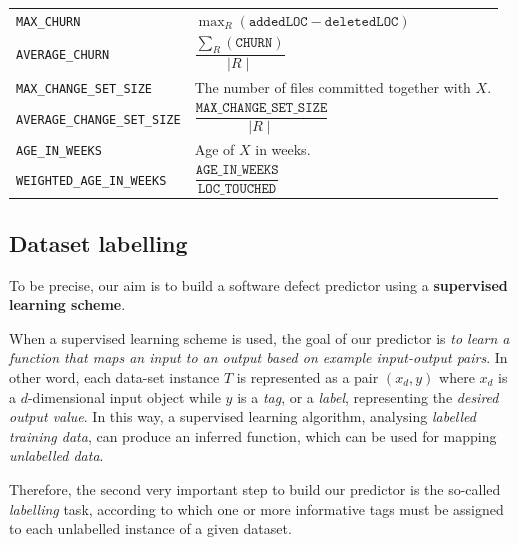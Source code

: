 \documentclass[sigconf]{acmart}
\begin{document}
\begin{table}
\begin{tabular}{l|p{4.3cm}}
\\

\texttt{MAX\_CHURN} & $\max_R (\texttt{addedLOC} - \texttt{deletedLOC})$

\\

\texttt{AVERAGE\_CHURN} & $\dfrac{\sum_R (\texttt{CHURN})}{\mid R \mid}$

\\

\texttt{MAX\_CHANGE\_SET\_SIZE} & The number of files committed together with $X$.

\\

\texttt{AVERAGE\_CHANGE\_SET\_SIZE} & $\dfrac{\texttt{MAX\_CHANGE\_SET\_SIZE}}{\mid R \mid}$

\\

\texttt{AGE\_IN\_WEEKS} & Age of $X$ in weeks.

\\

\texttt{WEIGHTED\_AGE\_IN\_WEEKS} & $\dfrac{\texttt{AGE\_IN\_WEEKS}}{\texttt{LOC\_TOUCHED}}$

\\

\bottomrule
\end{tabular}
\end{table}

\subsection{Dataset labelling}

To be precise, our aim is to build a software defect predictor using a \textbf{supervised learning scheme}.

When a supervised learning scheme is used, the goal of our predictor is \textit{to learn a function that maps an input to an output based on example input-output pairs}. In other word, each data-set instance $T$ is represented as a pair $(x_{d}, y)$ where $x_d$ is a $d$-dimensional input object while $y$ is a \textit{tag}, or a \textit{label}, representing the \textit{desired output value}. In this way, a supervised learning algorithm, analysing \textit{labelled training data}, can produce an inferred function, which can be used for mapping \textit{unlabelled data}.

Therefore, the second very important step to build our predictor is the so-called \textit{labelling} task, according to which one or more informative tags must be assigned to each unlabelled instance of a given dataset.
\end{document}
